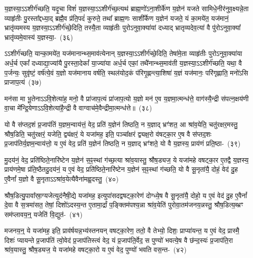 य॒ज्ञस्या॒\-ऽऽ\-शीर्ग॑च्छति॒ यदृ॒चा विशं॑ य॒ज्ञस्या॒\-ऽऽ\-शीर्ग॑च्छ॒त्यथ॑ ब्राह्म॒णो॑\-ऽना॒शीर्के॑ण य॒ज्ञेन॑ यजते सामिधे॒नीर॑नुव॒क्ष्यन्ने॒ता व्याहृ॑तीः पु॒रस्ता᳚द्दध्या॒द् ब्रह्मै॒व प्र॑ति॒पदं॑ कुरुते॒ तथा᳚ ब्राह्म॒णः साशी᳚र्केण य॒ज्ञेन॑ यजते॒ यं का॒मये॑त॒ यज॑मानं॒ भ्रातृ॑व्यमस्य य॒ज्ञस्या॒\-ऽऽ\-शीर्ग॑च्छे॒दिति॒ तस्यै॒ता व्याहृ॑तीः पुरो\-ऽनुवा॒क्या॑यां दध्याद् भ्रातृव्यदेव॒त्या॑ वै पु॑रो\-ऽनुवा॒क्या᳚ भ्रातृ॑व्यमे॒वास्य॑ य॒ज्ञस्या॒-~(३६)\ip

ऽऽशीर्ग॑च्छति॒ यान्का॒मये॑त॒ यज॑मानान्थ्स॒माव॑त्येनान् य॒ज्ञस्या॒\-ऽऽ\-शीर्ग॑च्छे॒दिति॒ तेषा॑मे॒ता व्याहृ॑तीः पुरो\-ऽनुवा॒क्या॑या अर्ध॒र्च एकां᳚ दध्याद्या॒ज्या॑यै पु॒रस्ता॒देकां᳚ या॒ज्या॑या अर्ध॒र्च एकां॒ तथै॑नान्थ्स॒माव॑ती य॒ज्ञस्या॒\-ऽऽ\-शीर्ग॑च्छति॒ यथा॒ वै प॒र्जन्यः॒ सुवृ॑ष्टं॒ वर्\mbox{}ष॑त्ये॒वं य॒ज्ञो यज॑मानाय वर्\mbox{}षति॒ स्थल॑योद॒कं प॑रिगृ॒ह्णन्त्या॒शिषा॑ य॒ज्ञं यज॑मानः॒ परि॑गृह्णाति॒ मनो॑\-ऽसि प्राजाप॒त्यं~(३७)\ip

मन॑सा मा भू॒तेना\-ऽऽ\-वि॒शेत्या॑ह॒ मनो॒ वै प्रा॑जाप॒त्यं प्रा॑जाप॒त्यो य॒ज्ञो मन॑ ए॒व य॒ज्ञमा॒त्मन्ध॑त्ते॒ वाग॑स्यै॒न्द्री स॑पत्न॒क्षय॑णी वा॒चा मे᳚न्द्रि॒येणा\-ऽऽ\-वि॒शेत्या॑है॒न्द्री वै वाग्वाच॑मे॒वैन्द्रीमा॒त्मन्ध॑त्ते॥~(३८)\ip

{\anuvakamend[{तेनै॒व ब्रह्म॑ रा॒ष्ट्रमे॒वास्य॑ य॒ज्ञस्य॑ प्राजाप॒त्यꣳ षट्त्रिꣳ॑शच्च}]}%

यो वै स॑प्तद॒शं प्र॒जा\-प॑तिं य॒ज्ञम॒न्वाय॑त्तं॒ वेद॒ प्रति॑ य॒ज्ञेन॑ तिष्ठति॒ न य॒ज्ञाद् भ्रꣳ॑शत॒ आ श्रा॑व॒येति॒ चतु॑रक्षर॒मस्तु॒ श्रौष॒डिति॒ चतु॑रक्षरं॒ यजेति॒ द्व्य॑क्षरं॒ ये यजा॑मह॒ इति॒ पञ्चा᳚क्षरं द्व्यक्ष॒रो व॑षट्का॒र ए॒ष वै स॑प्तद॒शः प्र॒जा\-प॑तिर्य॒ज्ञम॒न्वाय॑त्तो॒ य ए॒वं वेद॒ प्रति॑ य॒ज्ञेन॑ तिष्ठति॒ न य॒ज्ञाद् भ्रꣳ॑शते॒ यो वै य॒ज्ञस्य॒ प्राय॑णं प्रति॒ष्ठा-~(३९)\ip

मु॒दय॑नं॒ वेद॒ प्रति॑ष्ठिते॒नारि॑ष्टेन य॒ज्ञेन॑ स॒ꣴ॒स्थां ग॑च्छ॒त्या श्रा॑व॒यास्तु॒ श्रौष॒ड्यज॒ ये यजा॑महे वषट्का॒र ए॒तद्वै य॒ज्ञस्य॒ प्राय॑णमे॒षा प्र॑ति॒ष्ठैतदु॒दय॑नं॒ य ए॒वं वेद॒ प्रति॑ष्ठिते॒नारि॑ष्टेन य॒ज्ञेन॑ स॒ꣴ॒स्थां ग॑च्छति॒ यो वै सू॒नृता॑यै॒ दोहं॒ वेद॑ दु॒ह ए॒वैनां᳚ य॒ज्ञो वै सू॒नृता\-ऽऽ\-श्रा॑व॒येत्यैवैना॑मह्व॒दस्तु॒~(४०)\ip

श्रौष॒डित्यु॒पावा᳚स्रा॒ग्यजेत्युद॑नैषी॒द्ये यजा॑मह॒ इत्युपा॑स\-दद्वषट्का॒रेण॑ दोग्ध्ये॒ष वै सू॒नृता॑यै॒ दोहो॒ य ए॒वं वेद॑ दु॒ह ए॒वैनां᳚ दे॒वा वै स॒त्रमा॑सत॒ तेषां॒ दिशो॑\-ऽदस्य॒न्त ए॒तामा॒र्द्रां प॒ङ्क्तिम॑पश्य॒न्ना श्रा॑व॒येति॑ पुरोवा॒तम॑जनय॒न्नस्तु॒ श्रौष॒डित्य॒ब्भ्रꣳ सम॑प्लावय॒न्॒ यजेति॑ वि॒द्युत॑-~(४१)\ip

मजनय॒न्॒ ये यजा॑मह॒ इति॒ प्राव॑र्\mbox{}षयन्न॒भ्य॑स्तनयन् वषट्का॒रेण॒ ततो॒ वै तेभ्यो॒ दिशः॒ प्राप्या॑यन्त॒ य ए॒वं वेद॒ प्रास्मै॒ दिशः॑ प्यायन्ते प्र॒जा\-प॑तिं त्वो॒वेद॑ प्र॒जा\-प॑तिस्त्वं वेद॒ यं प्र॒जा\-प॑ति॒र्वेद॒ स पुण्यो॑ भवत्ये॒ष वै छ॑न्द॒स्यः॑ प्र॒जा\-प॑ति॒रा श्रा॑व॒यास्तु॒ श्रौष॒ड्यज॒ ये यजा॑महे वषट्का॒रो य ए॒वं वेद॒ पुण्यो॑ भवति वस॒न्त-~(४२)\ip

